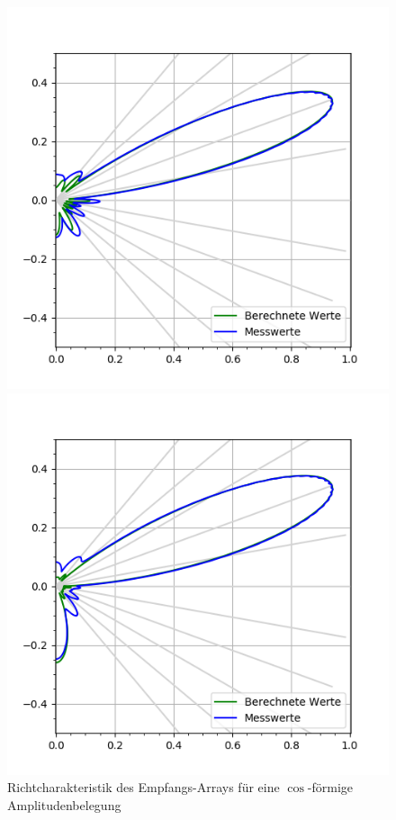 \begin{figure}[htb]
\begin{minipage}{0.5\textwidth}
\includegraphics[width=\textwidth]{graphics/plot_test_characteristic_receiver_20_deg_send_rect_receive_cos_4_bursts.png}
\caption{Richtcharakteristik des Empfangs-Arrays für eine $\cos$-förmige Amplitudenbelegung} %
\label{fig:plot_test_characteristic_receiver_20_deg_send_rect_receive_cos_4_bursts}
%
\end{minipage}
\begin{minipage}{0.5\textwidth}
\includegraphics[width=\textwidth]{graphics/plot_test_characteristic_receiver_20_deg_send_rect_receive_cos2_4_bursts.png}

\end{minipage}
\end{figure}
